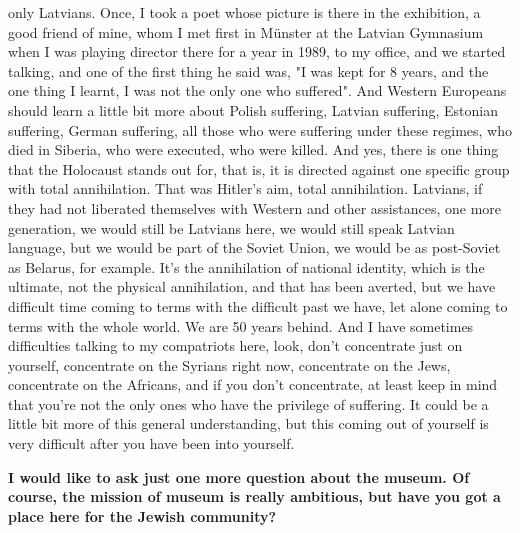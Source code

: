 only Latvians. Once, I took a poet whose picture is there in the exhibition, a good friend of mine, whom I met first in Münster at the Latvian Gymnasium when I was playing director there for a year in 1989, to my office, and we started talking, and one of the first thing he said was, "I was kept for 8 years, and the one thing I learnt, I was not the only one who suffered". And Western Europeans should learn a little bit more about Polish suffering, Latvian suffering, Estonian suffering, German suffering, all those who were suffering under these regimes, who died in Siberia, who were executed, who were killed. And yes, there is one thing that the Holocaust stands out for, that is, it is directed against one specific group with total annihilation. That was Hitler's aim, total annihilation. Latvians, if they had not liberated themselves with Western and other assistances, one more generation, we would still be Latvians here, we would still speak Latvian language, but we would be part of the Soviet Union, we would be as post-Soviet as Belarus, for example. It's the annihilation of national identity, which is the ultimate, not the physical annihilation, and that has been averted, but we have difficult time coming to terms with the difficult past we have, let alone coming to terms with the whole world. We are 50 years behind. And I have sometimes difficulties talking to my compatriots here, look, don't concentrate just on yourself, concentrate on the Syrians right now, concentrate on the Jews, concentrate on the Africans, and if you don’t concentrate, at least keep in mind that you're not the only ones who have the privilege of suffering. It could be a little bit more of this general understanding, but this coming out of yourself is very difficult after you have been into yourself. 

\textbf{I would like to ask just one more question about the museum. Of course, the mission of museum is really ambitious, but have you got a place here for the Jewish community?}

